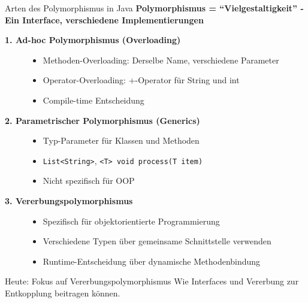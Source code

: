 \begin{frame}{Arten des Polymorphismus in Java}
  \textbf{Polymorphismus = ``Vielgestaltigkeit'' - Ein Interface, verschiedene Implementierungen}

  \begin{description}
    \item[\textbf{1. Ad-hoc Polymorphismus (Overloading)}]
      \begin{itemize}
        \item Methoden-Overloading: Derselbe Name, verschiedene Parameter
        \item Operator-Overloading: +-Operator für String und int
        \item Compile-time Entscheidung
      \end{itemize}

    \item[\textbf{2. Parametrischer Polymorphismus (Generics)}]
      \begin{itemize}
        \item Typ-Parameter für Klassen und Methoden
        \item \texttt{List<String>}, \texttt{<T> void process(T item)}
        \item Nicht spezifisch für OOP
      \end{itemize}

    \item[\textbf{3. Vererbungspolymorphismus}]
      \begin{itemize}
        \item Spezifisch für objektorientierte Programmierung
        \item Verschiedene Typen über gemeinsame Schnittstelle verwenden
        \item Runtime-Entscheidung über dynamische Methodenbindung
      \end{itemize}
  \end{description}

  \begin{exampleblock}{Heute: Fokus auf Vererbungspolymorphismus}
    Wie Interfaces und Vererbung zur Entkopplung beitragen können.
  \end{exampleblock}
\end{frame}

